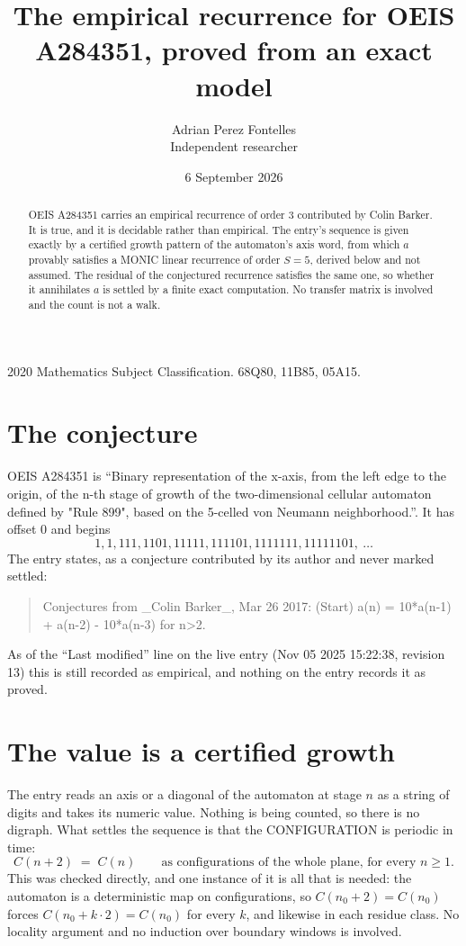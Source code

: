 \documentclass[11pt,a4paper]{article}
\title{The empirical recurrence for OEIS A284351, proved from an exact model}
\author{Adrian Perez Fontelles\\ \small Independent researcher}
\date{6 September 2026}
\theoremstyle{plain}
\theoremstyle{definition}
\begin{document}
\maketitle

\begin{abstract}
OEIS A284351 carries an empirical recurrence of order $3$ contributed by Colin Barker. It is true, and it is
decidable rather than empirical. The entry's sequence is given exactly by a certified growth pattern of the automaton's axis word, from
which $a$ provably satisfies a MONIC linear recurrence of order $S=5$, derived below and not
assumed. The residual of the conjectured recurrence satisfies the same one, so whether it
annihilates $a$ is settled by a finite exact computation. No transfer matrix is involved and
the count is not a walk.
\end{abstract}

\noindent\small 2020 Mathematics Subject Classification. 68Q80, 11B85, 05A15.\normalsize

\section{The conjecture}

OEIS A284351 is ``Binary representation of the x-axis, from the left edge to the origin, of the n-th stage of growth of the two-dimensional cellular automaton defined by "Rule 899", based on the 5-celled von Neumann neighborhood.''. It has offset $0$ and begins
\[
1, 1, 111, 1101, 11111, 111101, 1111111, 11111101,\ \dots
\]
The entry states, as a conjecture contributed by its author and never marked settled:
\begin{quote}
Conjectures from \_Colin Barker\_, Mar 26 2017: (Start) a(n) = 10*a(n-1) + a(n-2) - 10*a(n-3) for n>2.
\end{quote}
As of the ``Last modified'' line on the live entry (Nov 05 2025 15:22:38, revision 13)
this is still recorded as empirical, and nothing on the entry records it as proved.

\section{The value is a certified growth}

The entry reads an axis or a diagonal of the automaton at stage $n$ as a string of digits and
takes its numeric value. Nothing is being counted, so there is no digraph. What settles the
sequence is that the CONFIGURATION is periodic in time:
\[
C(n+2)\;=\;C(n)\qquad\text{as configurations of the whole plane, for every } n\ge 1.
\]
This was checked directly, and one instance of it is all that is needed: the automaton is a
deterministic map on configurations, so $C(n_0+2)=C(n_0)$ forces $C(n_0+k\cdot2)=C(n_0)$ for
every $k$, and likewise in each residue class. No locality argument and no induction over
boundary windows is involved.
\end{document}
